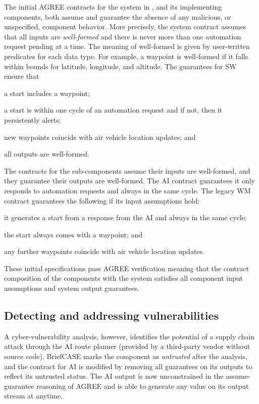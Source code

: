 The initial AGREE contracts for the system in ,
and its implementing components, both assume and guarantee the absence
of any malicious, or unspecified, component behavior.  More precisely,
the system contract assumes that all inputs are \emph{well-formed} and
there is never more than one automation request pending at a time.
The meaning of well-formed is given by user-written predicates for
each data type.  For example, a waypoint is well-formed if it falls
within bounds for latitude, longitude, and altitude.  The guarantees
for SW ensure that
\begin{compactitem}
\item a start includes a waypoint;
\item a start is within one cycle of an automation request and if not, then it persistently alerts;
\item new waypoints coincide with air vehicle location updates; and
\item all outputs are well-formed.
\end{compactitem}

The contracts for the sub-components assume their inputs are
well-formed, and they guarantee their outputs are well-formed.  The AI
contract guarantees it only responds to automation requests and always
in the same cycle.  The legacy WM contract guarantees the following if its input assumptions hold: 
\begin{compactitem}
  \item it generates a start from a response from the AI and always in the same cycle; 
  \item the start always comes with a waypoint; and 
  \item any further waypoints coincide with air vehicle location updates.  
\end{compactitem}
These initial specifications pass AGREE
verification meaning that the contract composition of the components
with the system satisfies all component input assumptions and system
output guarantees.

\subsection{Detecting and addressing vulnerabilities}
A cyber-vulnerability analysis, however, identifies the potential of a
supply chain attack through the AI route planner (provided by a
third-party vendor without source code).  BriefCASE marks the
component as \emph{untrusted} after the analysis, and the contract for
AI is modified by removing all guarantees on its outputs to reflect
its untrusted status.  The AI output is now unconstrained in the
assume-guarantee reasoning of AGREE and is able to generate any value
on its output stream at anytime.


